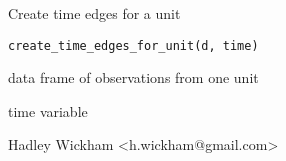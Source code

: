 \begin{Description}\relax
Create time edges for a unit
\end{Description}
\begin{Usage}
\begin{verbatim}create_time_edges_for_unit(d, time)\end{verbatim}
\end{Usage}
\begin{Arguments}
\begin{ldescription}
\item[\code{d}] data frame of observations from one unit
\item[\code{time}] time variable
\end{ldescription}
\end{Arguments}
\begin{Details}\relax
\end{Details}
\begin{Author}\relax
Hadley Wickham <h.wickham@gmail.com>
\end{Author}
\begin{Examples}
\begin{ExampleCode}\end{ExampleCode}
\end{Examples}

